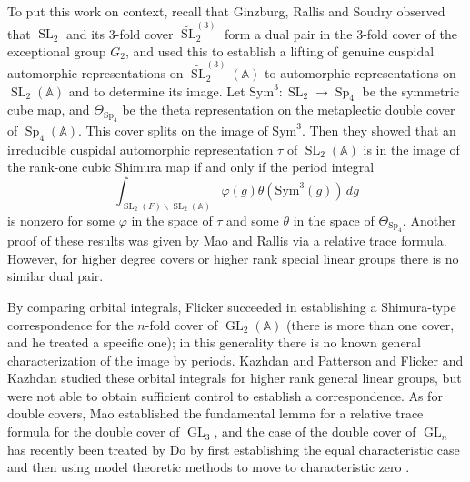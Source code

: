 \documentclass[12pt]{amsart}
\newcommand{\GL}{\operatorname{GL}}
\newcommand{\SL}{\operatorname{SL}}
\newcommand{\Sp}{\operatorname{Sp}}
\newcommand{\A}{\mathbb{A}}
\theoremstyle{remark}
\begin{document}
To put this work on context, recall that 
Ginzburg, Rallis and Soudry \cite{MR1439552} observed that $\SL_2$ and its 3-fold cover $\widetilde{\SL}_2^{(3)}$ form a dual pair in the 3-fold cover of the exceptional group $G_2$, and used this to establish a 
lifting of genuine cuspidal automorphic representations on $\widetilde{\SL}_2^{(3)}(\A)$ to automorphic representations on $\SL_2(\A)$ and to determine its image.
Let $\text{Sym}^3:\SL_2\to \Sp_4$ be the symmetric cube map, and $\Theta_{\Sp_4}$ be the theta representation on the metaplectic double cover of $\Sp_4(\mathbb{A})$.  This cover
splits on the image of $\text{Sym}^3$. Then they showed that an irreducible
cuspidal automorphic representation $\tau$ of $\SL_2(\A)$ is in the image of the rank-one cubic Shimura map if and only if the period integral
\begin{equation}\label{SL2-period}
\int_{\SL_2(F)\backslash \SL_2(\A)} \varphi(g)\theta(\text{Sym}^3(g))\,dg
\end{equation}
is nonzero for some $\varphi$ in the space of $\tau$ and some $\theta$ in the space of $\Theta_{\Sp_4}$. Another proof of these results was given by Mao and Rallis \cite{MR1729444} via a relative trace formula.
However, for higher degree covers or higher rank special linear groups there is no similar dual pair.

By comparing orbital integrals, Flicker \cite{MR567194} succeeded in establishing
a Shimura-type correspondence for the $n$-fold cover of $\GL_2(\A)$ (there is more than one cover, and he treated a specific one); in this generality there is no known general characterization of the image by periods.
Kazhdan and Patterson \cite{MR840303} and Flicker and Kazhdan \cite{MR876160} studied these orbital integrals for higher rank general linear groups, but were not able to obtain sufficient control to establish a correspondence.
As for double covers,  Mao \cite{MR1605813} established
 the fundamental lemma for a relative trace formula for the double cover of $\GL_3$, and the case of the double cover of $\GL_n$ has recently been treated by Do 
by first establishing the equal characteristic case  \cite{MR3323346} and then using model theoretic methods to move to characteristic zero \cite{MR4176834}.
  
\end{document}
